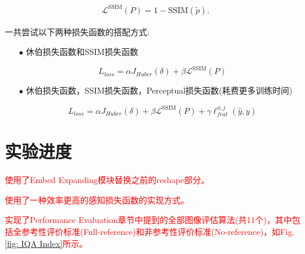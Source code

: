 \documentclass[a4paper, 10pt]{article}
\begin{document}
		\begin{equation}
			\begin{aligned}
				\mathcal{L}^{\text{SSIM}}(P)=1-\text{SSIM}(\tilde{p}).
			\end{aligned}
			\label{eq: revised_SSIM loss}
		\end{equation}
		
		
		一共尝试以下两种损失函数的搭配方式:
		
		\begin{itemize}
			\item[$\bullet$]
			休伯损失函数和SSIM损失函数
			
			\begin{equation}
				L_{loss} = \alpha J_{Huber}(\delta) + \beta \mathcal{L}^{\text{SSIM}}(P)
			\end{equation}
			
			\item[$\bullet$]
			休伯损失函数，SSIM损失函数，Perceptual损失函数(耗费更多训练时间)
			
			\begin{equation}
				L_{loss} = \alpha J_{Huber}(\delta) + \beta \mathcal{L}^{\text{SSIM}}(P) + \gamma \ell_{feat}^{\phi,j} (\hat{y},y)
			\end{equation}
		\end{itemize}
		
	\section{实验进度}
		
		\textcolor{red}{使用了Embed Expanding模块替换之前的reshape部分。}
		
		\textcolor{red}{使用了一种效率更高的感知损失函数的实现方式。}
	
		\textcolor{red}{实现了Performance Evaluation章节中提到的全部图像评估算法(共11个)，其中包括全参考性评价标准(Full-reference)和非参考性评价标准(No-reference)，如Fig. \ref{fig: IQA Index}所示。}
		
\end{document}
